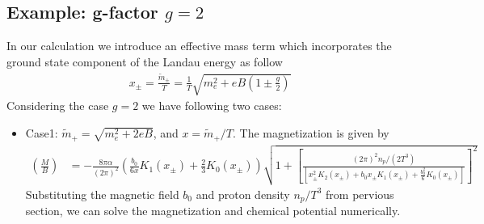 \documentclass[Universe,article,submit,moreauthors,pdftex]{Definitions/mdpi}
\begin{document}
\subsection{Example: g-factor $g=2$}
In our calculation we introduce an effective mass term which incorporates the ground state component of the Landau energy as follow
\begin{align}
x_\pm=\frac{\tilde{m}_\pm}{T}=\frac{1}{T}\sqrt{m^2_e+eB\left(1\pm\frac{g}{2}\right)}
\end{align}
Considering the case $g=2$ we have following two cases:
\begin{itemize}
  \item Case1: $\tilde m_+=\sqrt{m^2_e+2eB}$, and $x=\tilde m_+/T$. The magnetization is given by
  \begin{align}\label{Magnetization_001}
 \left(\frac{M}{B}\right)&=-\frac{8\pi\alpha}{(2\pi)^2}\left(\frac{b_0}{6x}K_1(x_\pm)+\frac{2}{3}K_0(x_\pm)\right)\sqrt{1+\left[\frac{{(2\pi)^2n_p}/{(2T^3)}}{\left[x_\pm^2K_2(x_\pm)+b_0x_\pm K_1(x_\pm)+\frac{b^2_0}{6}K_0(x_\pm)\right]}\right]^2}
   \end{align}
Substituting the magnetic field $b_0$ and proton density $n_p/T^3$ from pervious section, we can solve the magnetization and chemical potential numerically. 


\end{itemize}
\end{document}
